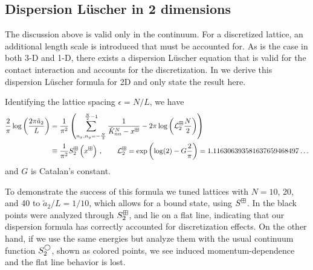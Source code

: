 \subsection{Dispersion L\"uscher in 2 dimensions}

The discussion above is valid only in the continuum.
For a discretized lattice, an additional length scale is introduced that must be accounted for.
As is the case in both 3-D and 1-D, there exists a dispersion L\"uscher equation that is valid for the contact interaction and accounts for the discretization.
In  we derive this dispersion L\"uscher formula for 2D and only state the result here.

Identifying the lattice spacing $\epsilon=N/L$, we have
\begin{align}
    \frac{2}{\pi} \log \left(\frac{2\pi \tilde a_{2}}{L}\right)
    &=
    \frac{1}{\pi^2}
    \left(
        \sum_{n_x,n_y=-\frac{N}{2}}^{\frac{N}{2}-1}\frac{1}{\tilde{K}^N_{nn}-x^\boxplus}
        -2\pi \log \left(\mathcal{L}^\boxplus_2\frac{N}{2}\right)
    \right)
    \nonumber\\
    &\equiv\frac{1}{\pi^2}S^{\boxplus}_2\left(x^\boxplus\right)\, ,\label{eq:2d dispersion luscher}
	\qquad
    \mathcal{L}^\boxplus_{2}
    =
    \exp \left(\log (2)-G \frac{2}{\pi}\right)
    =
    1.116306393581637659468497 \ldots
\end{align}
and $G$ is Catalan's constant. %


To demonstrate the success of this formula we tuned lattices with $N=10$, 20, and 40 to $\tilde a_{2}/L = {1}/{10}$, which allows for a bound state, using $S^{\boxplus}$.
In  the black points were analyzed through $S^\boxplus_2$, and lie on a flat line, indicating that our dispersion \Luscher formula has correctly accounted for discretization effects.
On the other hand, if we use the same energies but analyze them with the usual continuum \Luscher function $S^{\bigcirc}_2$, shown as colored points, we see induced momentum-dependence and the flat line behavior is lost.

